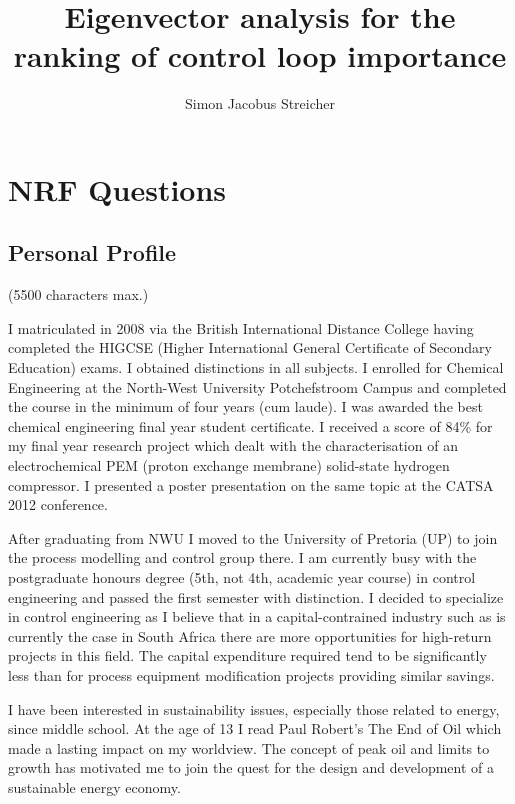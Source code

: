 \documentclass[a4paper]{book}
\newcommand{\subtitle}[1]{%
  \posttitle{%
    \par\end{center}
    \begin{center}\large#1\end{center}
    \vskip0.5em}%
}
\begin{document}
\title{Eigenvector analysis for the ranking of control loop importance}
\subtitle{Research proposal}
\author{Simon Jacobus Streicher}
\maketitle

\frontmatter

\chapter{NRF Questions}

\section{Personal Profile}
(5500 characters max.)

I matriculated in 2008 via the British International Distance College having completed the HIGCSE (Higher International General Certificate of Secondary Education) exams.
I obtained distinctions in all subjects.
I enrolled for Chemical Engineering at the North-West University Potchefstroom Campus and completed the course in the minimum of four years (cum laude).
I was awarded the best chemical engineering final year student certificate.
I received a score of 84\% for my final year research project which dealt with the characterisation of an electrochemical PEM (proton exchange membrane) solid-state hydrogen compressor.
I presented a poster presentation on the same topic at the CATSA 2012 conference.

After graduating from NWU I moved to the University of Pretoria (UP) to join the process modelling and control group there.
I am currently busy with the postgraduate honours degree (5th, not 4th, academic year course) in control engineering and passed the first semester with distinction.
I decided to specialize in control engineering as I believe that in a capital-contrained industry such as is currently the case in South Africa there are more opportunities for high-return projects in this field.
The capital expenditure required tend to be significantly less than for process equipment modification projects providing similar savings. 

I have been interested in sustainability issues, especially those related to energy, since middle school.
At the age of 13 I read Paul Robert's The End of Oil which made a lasting impact on my worldview.
The concept of peak oil and limits to growth has motivated me to join the quest for the design and development of a sustainable energy economy.
\end{document}
